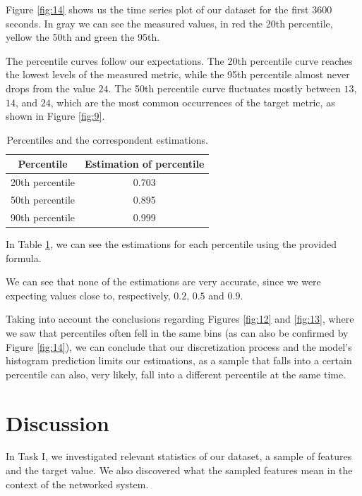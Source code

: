 \documentclass[10pt]{article}
\begin{document}
Figure \ref{fig:14} shows us the time series plot of our dataset for the first 3600 seconds. In gray we can see the measured values, in red the 20th percentile, yellow the 50th and green the 95th.

The percentile curves follow our expectations. The 20th percentile curve reaches the lowest levels of the measured metric, while the 95th percentile almost never drops from the value $24$. The 50th percentile curve fluctuates mostly between $13$, $14$, and $24$, which are the most common occurrences of the target metric, as shown in Figure \ref{fig:9}.

\begin{table}[h!]
    \centering
    \begin{tabular}{ | c | c | }
        \hline
        Percentile & Estimation of percentile \\ 
        \hline
        20th percentile & \num{0.703} \\ 
        \hline
        50th percentile & \num{0.895}\\ 
        \hline
        90th percentile & \num{0.999}\\ 
        \hline
    \end{tabular}
    \caption{Percentiles and the correspondent estimations.}
    \label{table:3}
\end{table}

In Table \ref{table:3}, we can see the estimations for each percentile using the provided formula.

We can see that none of the estimations are very accurate, since we were expecting values close to, respectively, $0.2$, $0.5$ and $0.9$.

Taking into account the conclusions regarding Figures \ref{fig:12} and \ref{fig:13}, where we saw that percentiles often fell in the same bins (as can also be confirmed by Figure \ref{fig:14}), we can conclude that our discretization process and the model's histogram prediction limits our estimations, as a sample that falls into a certain percentile can also, very likely, fall into a different percentile at the same time.

\section*{Discussion}

In Task I, we investigated relevant statistics of our dataset, a sample of features and the target value. We also discovered what the sampled features mean in the context of the networked system.
\end{document}
